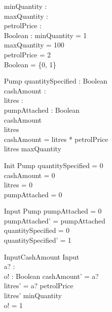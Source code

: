 

\begin{axdef}
  minQuantity : \nat \\
  maxQuantity : \nat \\
  petrolPrice : \nat \\
  Boolean : \power \nat
\where
  minQuantity = 1 \\
  maxQuantity = 100 \\
  petrolPrice = 2 \\
  Boolean = \{0, 1\}
\end{axdef}

\begin{schema}{Pump}
  quantitySpecified : Boolean \\
  cashAmount : \nat \\
  litres : \nat \\
  pumpAttached : Boolean \\
\where
  cashAmount  \\
  litres  \\
  cashAmount = litres * petrolPrice \\
  litres \leq maxQuantity
\end{schema}

\begin{schema}{Init}
  Pump
\where
  quantitySpecified = 0 \\
  cashAmount = 0 \\
  litres = 0 \\
  pumpAttached = 0 \\
\end{schema}

 \begin{schema}{Input}
  \Delta Pump
 \where
  pumpAttached = 0 \\
  pumpAttached' = pumpAttached\\
  quantitySpecified = 0 \\
  quantitySpecified' = 1
 \end{schema}

 \begin{schema}{InputCashAmount}
  Input \\
  a? : \nat \\
  o! : Boolean 
 \where
  cashAmount' = a? \\
  litres' = a? \div petrolPrice \\
  litres' \geq minQuantity \\
  o! = 1
 \end{schema}

